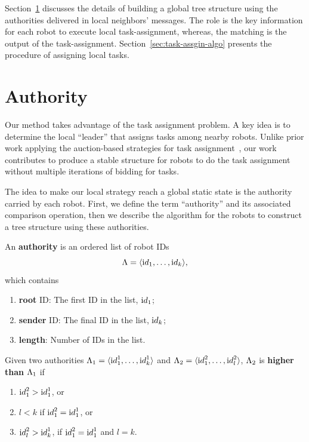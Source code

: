 Section~\ref{sec:auth} discusses the details of building a global tree structure using the authorities delivered in local neighbors' messages.
% 
The role is the key information for each robot to execute local task-assignment,
%
whereas, the matching is the output of the task-assignment.
%
Section~\ref{sec:task-assgin-algo} presents the procedure of assigning local tasks.

\section{Authority}
\label{sec:auth}

Our method takes advantage of the task assignment problem.
A key idea is to determine the local ``leader'' that assigns tasks among nearby robots. 
%
Unlike prior work applying the auction-based strategies for task assignment~\cite{Ber88, FarIocNarZip06, ZavSpePap08, MicZavKumPap08, ChoBruHow09, ChaHenIAS13, LiuShe13}, 
our work contributes to produce a stable structure for robots to do the 
task assignment without multiple iterations of bidding for tasks.


The idea to make our local strategy reach a global static state is the authority carried by each robot.  
%
First, we define the term ``authority'' and its associated comparison operation, 
then we describe the algorithm for the robots to construct a tree structure using these authorities.

\begin{defn}
  An \textbf{authority} is an ordered list of robot IDs
    $$\Lambda = \langle {\textrm id}_1, \ldots, {\textrm id}_k \rangle,$$
   which contains
    \begin{enumerate}
    \item \textbf{root} ID: The first ID in the list, ${\textrm id}_1$;
    \item \textbf{sender} ID: The final ID in the list, ${\textrm id}_k$;
    \item \textbf{length}: Number of IDs in the list.
    \end{enumerate}
\end{defn}

\begin{defn}
  Given two authorities
    $\Lambda_1=\langle {\textrm id}_1^1, \ldots, {\textrm id}_k^1\rangle$
  and
    $\Lambda_2=\langle {\textrm id}_1^2, \ldots, {\textrm id}_l^2\rangle$,
  $\Lambda_2$ is \textbf{higher than} $\Lambda_1$ if 
  \begin{enumerate}
    \item ${\textrm id}_1^2 > {\textrm id}_1^1$, or
    \item $l < k$ if ${\textrm id}_1^2 = {\textrm id}_1^1$, or
    \item ${\textrm id}_l^2 > {\textrm id}_k^1$, if ${\textrm id}_1^2 = {\textrm id}_1^1$ and $l = k$.
  \end{enumerate}
\end{defn}


